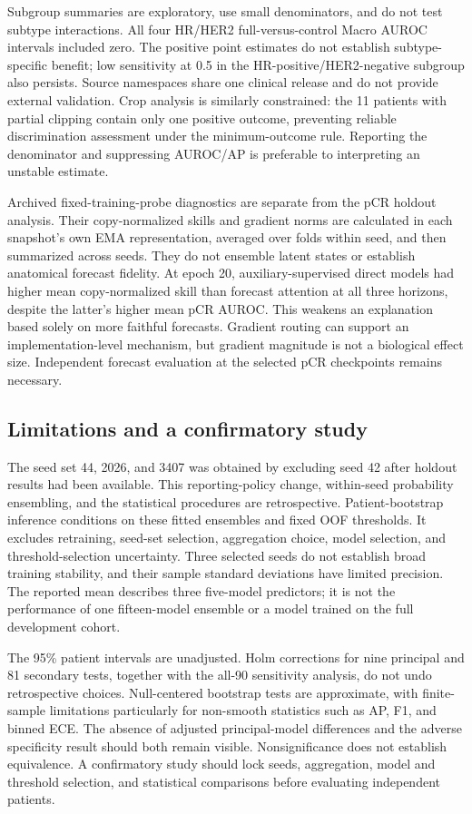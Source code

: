 Subgroup summaries are exploratory, use small denominators, and do not test subtype interactions. All four HR/HER2 full-versus-control Macro AUROC intervals included zero. The positive point estimates do not establish subtype-specific benefit; low sensitivity at 0.5 in the HR-positive/HER2-negative subgroup also persists. Source namespaces share one clinical release and do not provide external validation. Crop analysis is similarly constrained: the 11 patients with partial clipping contain only one positive outcome, preventing reliable discrimination assessment under the minimum-outcome rule. Reporting the denominator and suppressing AUROC/AP is preferable to interpreting an unstable estimate.

Archived fixed-training-probe diagnostics are separate from the pCR holdout analysis. Their copy-normalized skills and gradient norms are calculated in each snapshot's own EMA representation, averaged over folds within seed, and then summarized across seeds. They do not ensemble latent states or establish anatomical forecast fidelity. At epoch 20, auxiliary-supervised direct models had higher mean copy-normalized skill than forecast attention at all three horizons, despite the latter's higher mean pCR AUROC. This weakens an explanation based solely on more faithful forecasts. Gradient routing can support an implementation-level mechanism, but gradient magnitude is not a biological effect size. Independent forecast evaluation at the selected pCR checkpoints remains necessary.

\subsection{Limitations and a confirmatory study}
\label{sec:limitations}
The seed set 44, 2026, and 3407 was obtained by excluding seed 42 after holdout results had been available. This reporting-policy change, within-seed probability ensembling, and the statistical procedures are retrospective. Patient-bootstrap inference conditions on these fitted ensembles and fixed OOF thresholds. It excludes retraining, seed-set selection, aggregation choice, model selection, and threshold-selection uncertainty. Three selected seeds do not establish broad training stability, and their sample standard deviations have limited precision. The reported mean describes three five-model predictors; it is not the performance of one fifteen-model ensemble or a model trained on the full development cohort.

The 95\% patient intervals are unadjusted. Holm corrections for nine principal and 81 secondary tests, together with the all-90 sensitivity analysis, do not undo retrospective choices. Null-centered bootstrap tests are approximate, with finite-sample limitations particularly for non-smooth statistics such as AP, F1, and binned ECE. The absence of adjusted principal-model differences and the adverse specificity result should both remain visible. Nonsignificance does not establish equivalence. A confirmatory study should lock seeds, aggregation, model and threshold selection, and statistical comparisons before evaluating independent patients.

